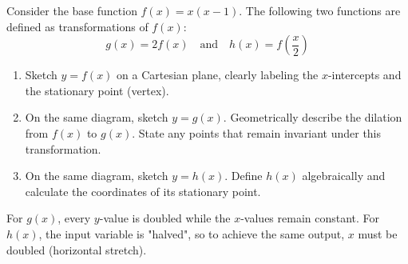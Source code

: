 \begin{problem}
Consider the base function $f(x) = x(x-1)$. The following two functions are defined as transformations of $f(x)$:
\[ g(x) = 2f(x) \quad \text{and} \quad h(x) = f\left(\frac{x}{2}\right) \]

\begin{enumerate}[label=(\roman*)]
    \item Sketch $y = f(x)$ on a Cartesian plane, clearly labeling the $x$-intercepts and the stationary point (vertex).
    \item On the same diagram, sketch $y = g(x)$. Geometrically describe the dilation from $f(x)$ to $g(x)$. State any points that remain invariant under this transformation.
    \item On the same diagram, sketch $y = h(x)$. Define $h(x)$ algebraically and calculate the coordinates of its stationary point.
\end{enumerate}

\begin{center}
\end{center}
\end{problem}

\begin{hint}
For $g(x)$, every $y$-value is doubled while the $x$-values remain constant. For $h(x)$, the input variable is "halved", so to achieve the same output, $x$ must be doubled (horizontal stretch).
\end{hint}

